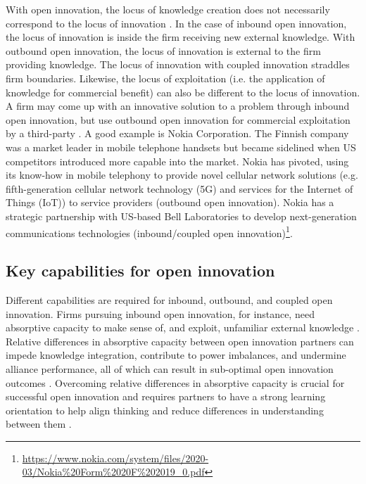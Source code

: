 With open innovation, the locus of knowledge creation does not necessarily correspond to the locus of innovation \citep{gassmann2004towards}. In the case of inbound open innovation, the locus of innovation is inside the firm receiving new external knowledge. With outbound open innovation, the locus of innovation is external to the firm providing knowledge. The locus of innovation with coupled innovation straddles firm boundaries. Likewise, the locus of exploitation (i.e. the application of knowledge for commercial benefit) can also be different to the locus of innovation. A firm may come up with an innovative solution to a problem through inbound open innovation, but use outbound open innovation for commercial exploitation by a third-party \citep{gassmann2004towards}. A good example is Nokia Corporation. The Finnish company was a market leader in mobile telephone handsets but became sidelined when US competitors introduced more capable  into the market. Nokia has pivoted, using its know-how in mobile telephony to provide novel cellular network solutions (e.g. fifth-generation cellular network technology (5G) and services for the Internet of Things (IoT)) to service providers (outbound open innovation). Nokia has a strategic partnership with US-based Bell Laboratories to develop next-generation communications technologies (inbound/coupled open innovation)\footnote{\url{https://www.nokia.com/system/files/2020-03/Nokia\%20Form\%2020F\%202019_0.pdf}}.  
 
\subsection{Key capabilities for open innovation}

Different capabilities are required for inbound, outbound, and coupled open innovation. Firms pursuing inbound open innovation, for instance, need absorptive capacity to make sense of, and exploit, unfamiliar external knowledge  \citep{vanhaverbeke2007,connectingkokshagina2017fast,bigliardi2021past}. Relative differences in absorptive capacity between open innovation partners can impede knowledge integration, contribute to power imbalances, and undermine alliance performance, all of which can result in sub-optimal open innovation outcomes \citep{lane1998relative,vanhaverbeke2007connecting,zobel2016benefiting,tell2017managing}. Overcoming relative differences in absorptive capacity is crucial for successful open innovation and requires partners to have a strong learning orientation to help align thinking and reduce differences in understanding between them  \citep{nooteboom2000learning,sun2010examination,de2016knowledge}. \medskip

